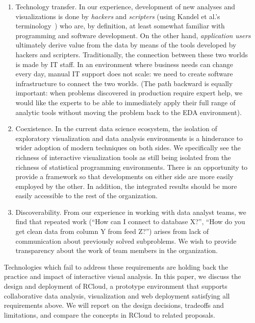 \begin{enumerate}

\item Technology transfer. In our experience, development
of new analyses and visualizations is done by \emph{hackers}
and \emph{scripters} (using Kandel et al.'s
terminology~\cite{Kandel:2012:EDA}) who are, by definition,
at least somewhat familiar with programming and software development.
On the other hand, \emph{application
users} ultimately derive value from the data by means of the tools
developed by hackers and scripters. Traditionally, the connection
between these two worlds is made by IT staff. In an environment where
business needs can change every day, manual IT support does not scale:
we need to create software infrastructure to connect the two worlds.
(The path backward is equally important: when problems discovered in
production require expert help, we would like the experts to be
able to immediately apply their full range of analytic tools without
moving the problem back to the EDA environment).

\item Coexistence. In the current data science ecosystem, the
isolation of exploratory visualization and data analysis
environments is a hinderance to wider adoption of modern techniques
on both sides. We specifically see the richness of interactive
visualization tools as still being isolated from the richness
of statistical programming environments.
There is an opportunity to provide a framework so that developments
on either side are more easily employed by the other.
In addition, the integrated results should be more easily accessible
to the rest of the organization.

\item Discoverability. From our experience in working with data
analyst teams, we find that repeated work (``How can I connect to
database X?'', ``How do you get clean data from column Y from feed
Z?'') arises from lack of communication about previously solved subproblems.
We wish to provide transparency about the work of team members in the organization.

\end{enumerate}

Technologies which fail to address these requirements
are holding back the practice and impact of interactive visual
analysis. In this paper, we discuss the design and deployment of
RCloud, a prototype environment that supports collaborative data
analysis, visualization and web deployment satisfying all requirements
above. We will report on the design decisions, tradeoffs and
limitations, and compare the concepts in RCloud to related proposals.

